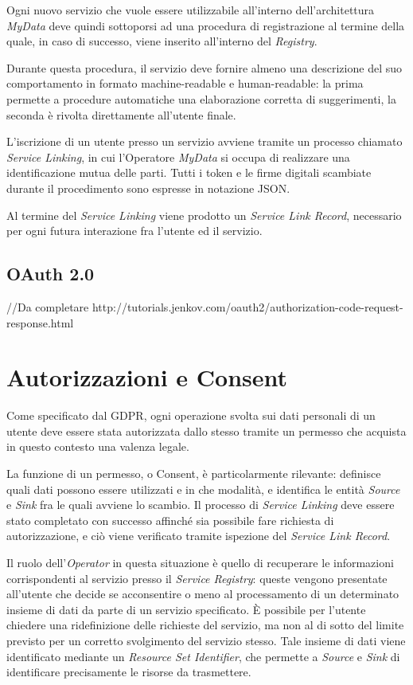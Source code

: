 Ogni nuovo servizio che vuole essere utilizzabile all’interno dell’architettura \textit{MyData} deve quindi sottoporsi ad una procedura di registrazione al termine della quale, in caso di successo, viene inserito all’interno del \textit{Registry}.

Durante questa procedura, il servizio deve fornire almeno una descrizione del suo comportamento in formato machine-readable e human-readable: la prima permette a procedure automatiche una elaborazione corretta di suggerimenti, la seconda \`e rivolta direttamente all’utente finale.

L’iscrizione di un utente presso un servizio avviene tramite un processo chiamato \textit{Service Linking}, in cui l’Operatore \textit{MyData} si occupa di realizzare una identificazione mutua delle parti. Tutti i token e le firme digitali scambiate durante il procedimento sono espresse in notazione JSON.

Al termine del \textit{Service Linking} viene prodotto un \textit{Service Link Record}, necessario per ogni futura interazione fra l’utente ed il servizio.

\subsection{OAuth 2.0}
//Da completare
\cite{oauth}
http://tutorials.jenkov.com/oauth2/authorization-code-request-response.html

\section{Autorizzazioni e Consent}
\label{sec:MD-AuthConsent}
Come specificato dal GDPR, ogni operazione svolta sui dati personali di un utente deve essere stata autorizzata dallo stesso tramite un permesso che acquista in questo contesto una valenza legale.

La funzione di un permesso, o Consent, \`e particolarmente rilevante: definisce quali dati possono essere utilizzati e in che modalit\`a, e identifica le entit\`a \textit{Source} e \textit{Sink} fra le quali avviene lo scambio. Il processo di \textit{Service Linking} deve essere stato completato con successo affinch\'e sia possibile fare richiesta di autorizzazione, e ci\`o viene verificato tramite ispezione del \textit{Service Link Record}.

Il ruolo dell’\textit{Operator} in questa situazione \`e quello di recuperare le informazioni corrispondenti al servizio presso il \textit{Service Registry}: queste vengono presentate all’utente che decide se acconsentire o meno al processamento di un determinato insieme di dati da parte di un servizio specificato. \`E possibile per l’utente chiedere una ridefinizione delle richieste del servizio, ma non al di sotto del limite previsto per un corretto svolgimento del servizio stesso. Tale insieme di dati viene identificato mediante un \textit{Resource Set Identifier}, che permette a \textit{Source} e \textit{Sink} di identificare precisamente le risorse da trasmettere.

